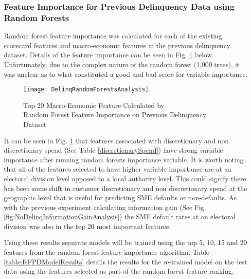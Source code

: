 \subsubsection{Feature Importance for Previous Delinquency Data using Random Forests}\label{RFPDExper}
Random forest feature importance was calculated for
each of the existing scorecard features and macro-economic features in the previous delinquency dataset. Details of the feature importance can be seen in Fig. \ref{fig:DelinqRandomForestsAnalysis} below. Unfortunately, due to the complex nature of the random forest (1,000 trees), it was unclear as to what constituted a good and bad score for variable importance.

\begin{figure}[H]
	\texttt{[image: DelinqRandomForestsAnalysis]}
	\caption{Top 20 Macro-Economic Feature Calculated by \\
		Random Forest Feature Importance on Previous Delinquency Dataset}
	\label{fig:DelinqRandomForestsAnalysis}
\end{figure}

It can be seen in Fig. \ref{fig:DelinqRandomForestsAnalysis} that features associated with discretionary and non discretionary spend (See Table \ref{discretionarySpend}) have strong variable importance after running random forests importance variable. It is worth noting that all of the features selected to have higher variable importance are at an electoral division level opposed to a local authority level. This could signify there has been some shift in customer discretionary and non discretionary spend at the geographic level that is useful for predicting SME defaults or non-defaults. As with the previous experiment calculating information gain  (See Fig. \ref{fig:NoDelinqInformationGainAnalysis}) the SME default rates at an electoral division was also in the top 20 most important features.

Using these results separate models will be trained using the top 5, 10, 15 and 20 features from
the random forest feature importance algorithm. Table \ref{table:RFPDModelResults} details the results for the re-trained model
on the test data using the features selected as part of the random forest feature ranking.

